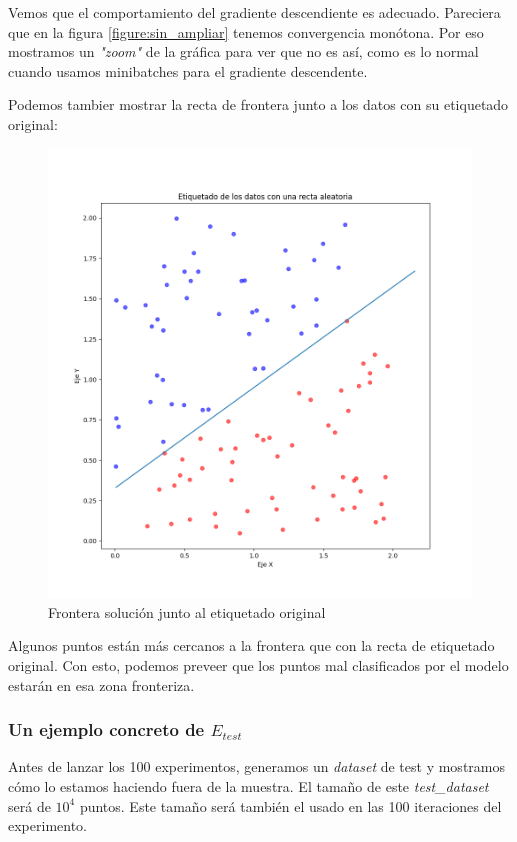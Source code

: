 \documentclass[11pt]{article}
\begin{document}
Vemos que el comportamiento del gradiente descendiente es adecuado. Pareciera que en la figura \ref{figure:sin_ampliar} tenemos convergencia monótona. Por eso mostramos un \emph{"zoom"} de la gráfica para ver que no es así, como es lo normal cuando usamos minibatches para el gradiente descendente.

Podemos tambier mostrar la recta de frontera junto a los datos con su etiquetado original:

\begin{figure}[H]
    \centering
    \includegraphics[scale=0.35]{frontera_resultado_lgr}
    \caption{Frontera solución junto al etiquetado original}
\end{figure}

Algunos puntos están más cercanos a la frontera que con la recta de etiquetado original. Con esto, podemos preveer que los puntos mal clasificados por el modelo estarán en esa zona fronteriza.

\subsubsection{Un ejemplo concreto de $E_{test}$}

Antes de lanzar los 100 experimentos, generamos un \emph{dataset} de test y mostramos cómo lo estamos haciendo fuera de la muestra. El tamaño de este \emph{test\_dataset} será de $10^4$ puntos. Este tamaño será también el usado en las 100 iteraciones del experimento.
\end{document}
